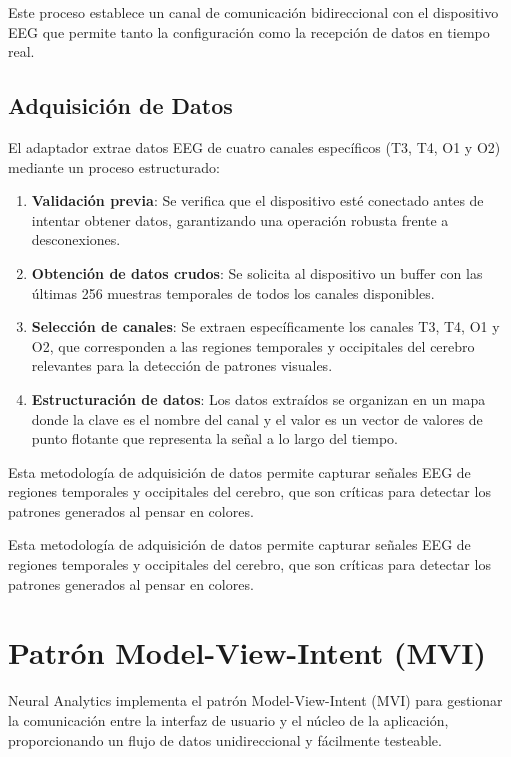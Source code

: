 Este proceso establece un canal de comunicación bidireccional con el dispositivo EEG que permite tanto la configuración como la recepción de datos en tiempo real.

\subsection{Adquisición de Datos}

El adaptador extrae datos EEG de cuatro canales específicos (T3, T4, O1 y O2) mediante un proceso estructurado:

\begin{enumerate}
    \item \textbf{Validación previa}: Se verifica que el dispositivo esté conectado antes de intentar obtener datos, garantizando una operación robusta frente a desconexiones.
    
    \item \textbf{Obtención de datos crudos}: Se solicita al dispositivo un buffer con las últimas 256 muestras temporales de todos los canales disponibles.
    
    \item \textbf{Selección de canales}: Se extraen específicamente los canales T3, T4, O1 y O2, que corresponden a las regiones temporales y occipitales del cerebro relevantes para la detección de patrones visuales.
    
    \item \textbf{Estructuración de datos}: Los datos extraídos se organizan en un mapa donde la clave es el nombre del canal y el valor es un vector de valores de punto flotante que representa la señal a lo largo del tiempo.
\end{enumerate}

Esta metodología de adquisición de datos permite capturar señales EEG de regiones temporales y occipitales del cerebro, que son críticas para detectar los patrones generados al pensar en colores.

Esta metodología de adquisición de datos permite capturar señales EEG de regiones temporales y occipitales del cerebro, que son críticas para detectar los patrones generados al pensar en colores.

\section{Patrón Model-View-Intent (MVI)}

Neural Analytics implementa el patrón Model-View-Intent (MVI) para gestionar la comunicación entre la interfaz de usuario y el núcleo de la aplicación, proporcionando un flujo de datos unidireccional y fácilmente testeable.

